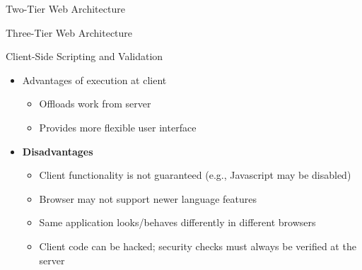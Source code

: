 \documentclass[aspectratio=169, xcolor=dvipsnames]{beamer}
\begin{document}
\begin{frame}{Two-Tier Web Architecture}
    \begin{center}
    \end{center}
\end{frame}

\begin{frame}{Three-Tier Web Architecture}
    \begin{center}
    \end{center}
\end{frame}

\begin{frame}{Client-Side Scripting and Validation}
    \begin{itemize}[<+->]
        \item Advantages of execution at client
        \begin{itemize}
            \item[$\triangleright$] Offloads work from server
            \item[$\triangleright$] Provides more flexible user interface
        \end{itemize}
        \item \textbf{Disadvantages}
        \begin{itemize}
            \item[$\triangleright$] Client functionality is not guaranteed (e.g., Javascript may be disabled)
            \item[$\triangleright$] Browser may not support newer language features
            \item[$\triangleright$] Same application looks/behaves differently in different browsers
            \item[$\triangleright$] Client code can be hacked; security checks must always be verified at the server
        \end{itemize}
    \end{itemize}
\end{frame}
\end{document}
